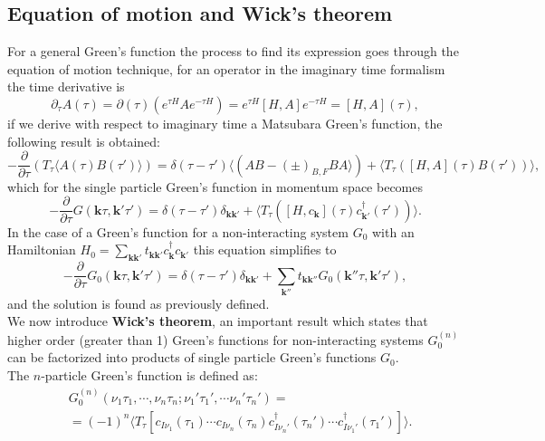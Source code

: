 \subsection{Equation of motion and Wick's theorem}
For a general Green's function the process to find its expression goes through the equation of motion technique, for an  
operator in the imaginary time formalism the time derivative is
\begin{equation}
    \partial_\tau A(\tau)= \partial(\tau)\left(e^{\tau H}Ae^{-\tau H}\right)=e^{\tau H}[H,A]e^{-\tau H}=[H,A](\tau),
\end{equation}
if we derive with respect to imaginary time a Matsubara Green's function, the following result is obtained:
\begin{equation}
    -\frac{\partial}{\partial\tau}\left(T_\tau\langle A(\tau)B(\tau')\rangle\right)=\delta(\tau-\tau')\langle(AB-(\pm)_{B,F}BA\rangle)+\langle T_\tau\left([H,A](\tau)B(\tau')\right)\rangle,
\end{equation}
which for the single particle Green's function in momentum space becomes
\begin{equation}
    -\frac{\partial}{\partial \tau} G(\mathbf{k}\tau,\mathbf{k}'\tau')=\delta(\tau-\tau')\delta_{\mathbf{k}\mathbf{k}'}+\langle T_\tau\left([H,c_\mathbf{k}](\tau)c^\dagger_{\mathbf{k}'}(\tau')\right)\rangle.
\end{equation}
In the case of a Green's function for a non-interacting system $G_0$ with an Hamiltonian $H_0=\sum_{\mathbf{kk}'}t_{\mathbf{kk}'}c^\dagger_\mathbf{k}c_{\mathbf{k}'}$ this equation simplifies to
\begin{equation}
    -\frac{\partial}{\partial\tau}G_0(\mathbf{k}\tau,\mathbf{k}'\tau')=\delta(\tau-\tau')\delta_{\mathbf{k}\mathbf{k}'}+\sum_{\mathbf{k}''}t_{\mathbf{kk}''}G_0(\mathbf{k}''\tau,\mathbf{k}'\tau'),
\end{equation}
and the solution is found as previously defined.\\
We now introduce \textbf{Wick's theorem}, an important result which states that higher order (greater than 1) Green's functions for non-interacting 
systems $G_0^{(n)}$ can be factorized into products of single particle Green's functions $G_0$.\\
The $n$-particle Green's function is defined as:
\begin{equation}
\begin{split}
    &G_0^{(n)}(\nu_1\tau_1,\cdots,\nu_n\tau_n;\nu_1'\tau_1',\cdots\nu_n'\tau_n')=\\
    &=(-1)^n\langle T_\tau \left[c_{I\nu_1}(\tau_1)\cdots c_{I\nu_n}(\tau_n)c^\dagger_{I\nu_n'}(\tau_n')\cdots c^\dagger_{I\nu_1'}(\tau_1')\right]\rangle. 
\end{split}
    \label{G_0_n-order}
\end{equation}
